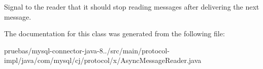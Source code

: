 Signal to the reader that it should stop reading messages after delivering the next message. 

The documentation for this class was generated from the following file\+:\begin{DoxyCompactItemize}
\item 
pruebas/mysql-\/connector-\/java-\/8../src/main/protocol-\/impl/java/com/mysql/cj/protocol/x/Async\+Message\+Reader.\+java\end{DoxyCompactItemize}
